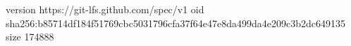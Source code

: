 version https://git-lfs.github.com/spec/v1
oid sha256:b85714df184f51769cbc5031796cfa37f64e47e8da499da4e209c3b2dc649135
size 174888

